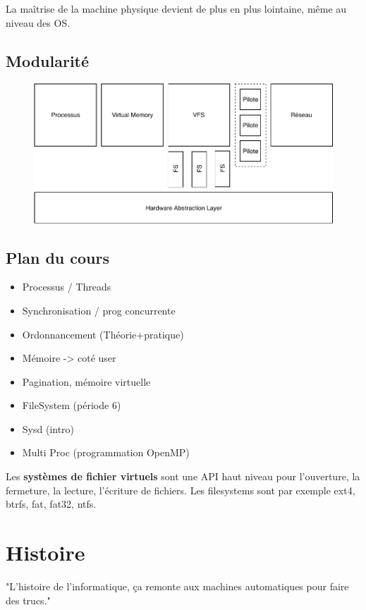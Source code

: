\documentclass[11pt]{article}
\begin{document}
La maîtrise de la machine physique devient de plus en plus lointaine, même au niveau des OS.

\subsection{Modularité}
\begin{figure}[h!]
	\centering
	\includegraphics{img/modular-os.pdf}
\end{figure}


\subsection{Plan du cours}
\begin{itemize}
	\item Processus / Threads
	\item Synchronisation / prog concurrente
	\item Ordonnancement (Théorie+pratique)
	\item Mémoire -> coté user
	\item Pagination, mémoire virtuelle
	\item FileSystem (période 6)
	\item Sysd (intro)
	\item Multi Proc (programmation OpenMP)
\end{itemize}

Les \textbf{systèmes de fichier virtuels} sont une API haut niveau pour l'ouverture, la fermeture, la lecture, l'écriture de fichiers. Les filesystems sont par exemple ext4, btrfs, fat, fat32, ntfs.

\section{Histoire}
"L'histoire de l'informatique, ça remonte aux machines automatiques pour faire des trucs."
\end{document}
